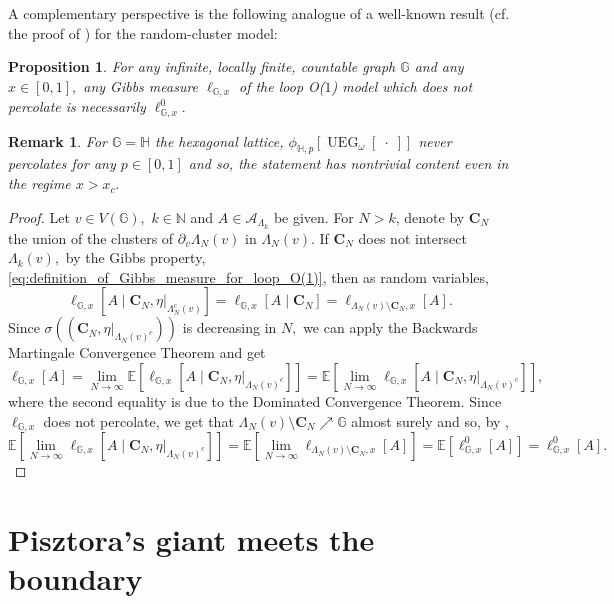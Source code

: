 \documentclass[article,11pt,reqno]{amsart}
\newtheorem{proposition}[theorem]{Proposition}
\newtheorem{remark}[theorem]{Remark}
\begin{document}
\begin{appendix}
A complementary perspective is the following analogue of a well-known result (cf. the proof of \cite[Theorem 5.33a)]{Gri06}) for the random-cluster model:
\begin{proposition} \label{Unique Non-perc}
For any infinite, locally finite, countable graph $\mathbb{G}$ and any $x\in [0,1],$ any Gibbs measure $\ell_{\mathbb{G},x}$ of the loop O($1$) model which does not percolate is necessarily $\ell^0_{\mathbb{G},x}.$
\end{proposition}
\begin{remark}
For $\mathbb{G}=\mathbb{H}$ the hexagonal lattice, $\phi_{\mathbb{H},p}[\operatorname{UEG}_{\omega}[\;\cdot\;]]$ never percolates for any $p\in[0,1]$ and so, the statement has nontrivial content even in the regime $x>x_c.$
\end{remark}
\begin{proof}
Let $v\in V(\mathbb{G}),$ $k\in \mathbb{N}$ and $A\in \mathcal{A}_{\Lambda_k}$ be given. For $N>k$, denote by $\mathbf{C}_N$ the union of the clusters of $\partial_v \Lambda_N(v)$ in $\Lambda_N(v)$. If $\mathbf{C}_N$ does not intersect $\Lambda_k(v),$ by the Gibbs property, \eqref{eq:definition_of_Gibbs_measure_for_loop_O(1)}, then as random variables,
$$
\ell_{\mathbb{G},x}[A\mid \mathbf{C}_N,\eta|_{\Lambda_N^c(v)} ]=\ell_{\mathbb{G},x}[A\mid \mathbf{C}_N ]=\ell_{\Lambda_N(v)\setminus \mathbf{C}_N,x}[A].
$$
Since $\sigma((\mathbf{C}_N,\eta|_{\Lambda_N(v)^c}))$ is decreasing in $N,$ we can apply the Backwards Martingale Convergence Theorem and get
$$
\ell_{\mathbb{G},x}[A]= \lim_{N\to\infty}\mathbb{E}[\ell_{\mathbb{G},x}[A\mid \mathbf{C}_N,\eta|_{\Lambda_N(v)^c} ]]=\mathbb{E}[\lim_{N\to\infty}\ell_{\mathbb{G},x}[A\mid \mathbf{C}_N,\eta|_{\Lambda_N(v)^c} ]],
$$
where the second equality is due to the Dominated Convergence Theorem. Since $\ell_{\mathbb{G},x}$ does not percolate, we get that $\Lambda_N(v)\setminus \mathbf{C}_N\nearrow \mathbb{G}$ almost surely and so, by ,
$$
\mathbb{E}[\lim_{N\to\infty}\ell_{\mathbb{G},x}[A\mid \mathbf{C}_N,\eta|_{\Lambda_N(v)^c} ]]=  \mathbb{E}[\lim_{N\to\infty}\ell_{\Lambda_N(v)\setminus \mathbf{C}_N,x}[A]]=\mathbb{E}[\ell^0_{\mathbb{G},x}[A]]=\ell^0_{\mathbb{G},x}[A].
$$
\end{proof}


\section{Pisztora's giant meets the boundary} 




\end{appendix}
\end{document}
